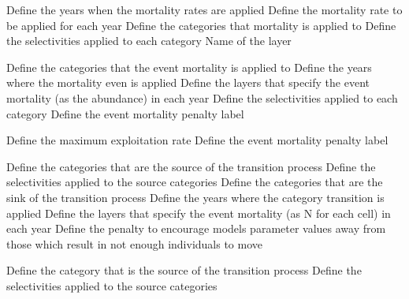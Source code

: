  {Define the years when the mortality rates are applied}
 {Define the mortality rate to be applied for each year}
 {Define the categories that mortality is applied to}
 {Define the selectivities applied to each category}
 {Name of the layer}
\par\textbf{}\par
{} {Define the categories that the event mortality is applied to}
 {Define the years where the mortality even is applied}
 {Define the layers that specify the event mortality (as the abundance) in each year}
 {Define the selectivities applied to each category}
 {Define the event mortality penalty label}
\par\textbf{}\par
{}
 {Define the maximum exploitation rate}
 {Define the event mortality penalty label}
\par\textbf{}\par
{} {Define the categories that are the source of the transition process}
 {Define the selectivities applied to the source categories}
 {Define the categories that are the sink of the transition process}
 {Define the years where the category transition is applied}
 {Define the layers that specify the event mortality (as N for each cell) in each year}
 {Define the penalty to encourage models parameter values away from those which result in not enough individuals to move}
\par\textbf{}\par
{} {Define the category that is the source of the transition process}
 {Define the selectivities applied to the source categories}
